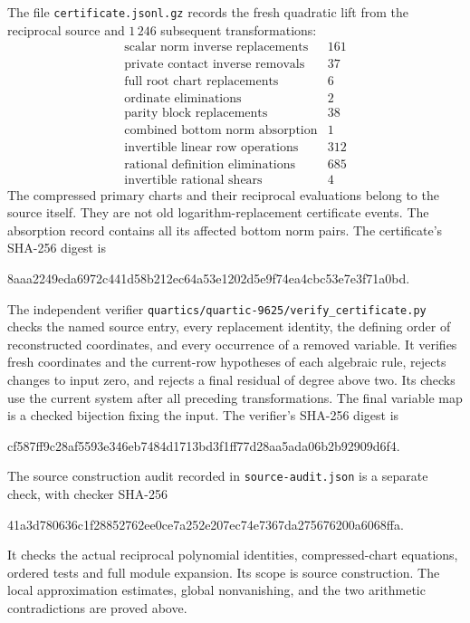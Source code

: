 \documentclass[11pt]{article}
\theoremstyle{definition}
\theoremstyle{remark}
\begin{document}
The file \nolinkurl{certificate.jsonl.gz} records the fresh quadratic
lift from the reciprocal source and $1\,246$ subsequent transformations:
\[
\begin{array}{lr}
\text{scalar norm inverse replacements}&161\\
\text{private contact inverse removals}&37\\
\text{full root chart replacements}&6\\
\text{ordinate eliminations}&2\\
\text{parity block replacements}&38\\
\text{combined bottom norm absorption}&1\\
\text{invertible linear row operations}&312\\
\text{rational definition eliminations}&685\\
\text{invertible rational shears}&4
\end{array}
\]
The compressed primary charts and their reciprocal evaluations belong to
the source itself. They are not old logarithm-replacement certificate events.
The absorption record contains all its affected bottom norm pairs.
The certificate's SHA-256 digest is
\begin{center}\footnotesize\ttfamily
8aaa2249eda6972c441d58b212ec64a53e1202d5e9f74ea4cbc53e7e3f71a0bd.
\end{center}

The independent verifier
\nolinkurl{quartics/quartic-9625/verify_certificate.py}
checks the named source entry, every replacement identity, the defining
order of reconstructed coordinates, and every occurrence of a removed
variable. It verifies fresh coordinates and the current-row hypotheses of
each algebraic rule, rejects changes to input zero, and rejects a final
residual of degree above two. Its checks use the current system after all
preceding transformations. The final variable map is a checked bijection
fixing the input. The verifier's SHA-256 digest is
\begin{center}\footnotesize\ttfamily
cf587ff9c28af5593e346eb7484d1713bd3f1ff77d28aa5ada06b2b92909d6f4.
\end{center}

The source construction audit recorded in \nolinkurl{source-audit.json}
is a separate check, with checker SHA-256
\begin{center}\footnotesize\ttfamily
41a3d780636c1f28852762ee0ce7a252e207ec74e7367da275676200a6068ffa.
\end{center}
It checks the actual reciprocal polynomial identities, compressed-chart
equations, ordered tests and full module expansion. Its scope is source
construction. The local approximation estimates, global nonvanishing,
and the two arithmetic contradictions are proved above.
\end{document}
